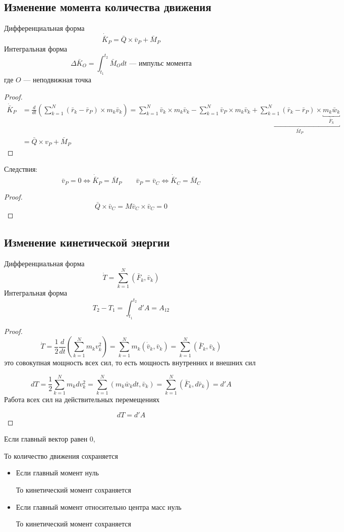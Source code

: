 \documentclass[crop=false]{standalone}
\begin{document}
\subsection{Изменение момента количества движения}
Дифференциальная форма
\[\dot {\bar K}_P  = \bar Q \times \bar v_P + \bar M_P\]
Интегральная форма
\[\Delta \bar K_O = \int_{t_1}^{t_2} \bar M_O dt \text{ — импульс момента}\]
где $O$ — неподвижная точка
\begin{proof}
    \[
        \begin{aligned}
            \dot{\bar K}_P &= \frac{d}{d t}\left(\sum_{k=1}^{N} (\bar r_k - \bar r_P) \times m_k \bar v_k \right)
            = \sum_{k=1}^N \bar v_k \times m_k \bar v_k - \sum_{k=1}^N \bar v_P \times m_k \bar v_k  + \underbracket{\sum_{k=1}^{N} (\bar r_k - \bar r_P) \times \underbracket{m_k \bar w_k}_{\bar F_k}}_{\bar M_P}
            \\ &= \bar Q \times v_P + \bar M_P
        \end{aligned}
        \]
\end{proof}
Следствия:        
        \[\bar v_P = 0 \iff \dot {\bar K}_P = \bar M_P  \qquad \bar v_P = \bar v_C \iff \dot{\bar K}_C = \bar M_C\]
        \begin{proof}
            \[\bar Q \times \bar v_C = M \bar v_C \times \bar v_C = 0\]
        \end{proof}

\subsection{Изменение кинетической энергии}
Дифференциальная форма
\[\dot T = \sum_{k=1}^N(\bar F_k, \bar v_k)\]
Интегральная форма
\[T_2 - T_1 = \int_{t_1}^{t_2} d' A = A_{1 2}\]
\begin{proof}
\[\dot T = \frac{1}{2} \frac{d}{d t}\left(\sum_{k=1}^N m_k v_k^2\right) = \sum_{k=1}^N m_k (\dot{\bar v}_k, \bar v_k)  = \sum_{k=1}^N (\bar F_k, \bar v_k)\]
это совокупная мощность всех сил, то есть мощность внутренних и внешних сил

\[d T = \frac{1}{2} \sum_{k=1}^N m_k d v_k^2 = \sum_{k=1}^N (m_k \bar w_k d t, \bar v_k) = \sum_{k=1}^N (\bar F_k , d \bar r_k) = d' A\]
Работа всех сил на действительных перемещениях

\[d T = d' A\]
\end{proof}
\begin{theorem}
Если главный вектор равен 0, 

То количество движения сохраняется
\end{theorem}

\begin{theorem}
    \begin{itemize}
        \item 
        Если главный момент нуль
        
        То кинетический момент сохраняется
        
        \item
        Если главный момент относительно центра масс нуль
        
        То кинетический момент сохраняется
    \end{itemize}
\end{theorem}
\end{document}

